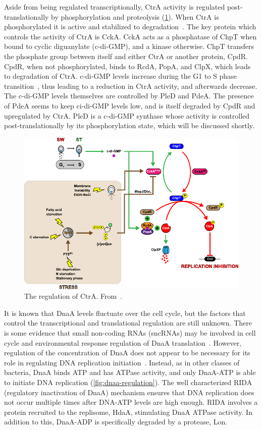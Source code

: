 Aside from being regulated transcriptionally, CtrA activity is regulated post-translationally by phosphorylation and proteolysis (\cref{fig:ctra-regulation}).
When CtrA is phosphorylated it is active and stabilized to degradation~\cite{frandi2019}.
The key protein which controls the activity of CtrA is CckA.
CckA acts as a phosphatase of ChpT when bound to cyclic diguanylate (c-di-GMP), and a kinase otherwise.
ChpT transfers the phosphate group between itself and either CtrA or another protein, CpdR.
CpdR, when not phosphorylated, binds to RcdA, PopA, and ClpX, which leads to degradation of CtrA.
c-di-GMP levels increase during the G1 to S phase transition~\cite{hallez2017}, thus leading to a reduction in CtrA activity, and afterwards decrease.
The c-di-GMP levels themselves are controlled by PleD and PdeA.
The presence of PdeA seems to keep ci-di-GMP levels low, and is itself degraded by CpdR and upregulated by CtrA.
PleD is a c-di-GMP synthase whose activity is controlled post-translationally by its phosphorylation state, which will be discussed shortly.

\begin{figure}
    \centering
    \includegraphics{ctra-regulation}
    \caption{
        The regulation of CtrA.
        From~\cite{frandi2019}.
        \label{fig:ctra-regulation}
     }
\end{figure}

It is known that DnaA levels fluctuate over the cell cycle, but the factors that control the transcriptional and translational regulation are still unknown.
There is some evidence that small non-coding RNAs (sncRNAs) may be involved in cell cycle and environmental response regulation of DnaA translation~\cite{felletti2019}.
However, regulation of the concentration of DnaA does not appear to be necessary for its role in regulating DNA replication initiation~\cite{jonas2011}.
Instead, as in other classes of bacteria, DnaA binds ATP and has ATPase activity, and only DnaA-ATP is able to initiate DNA replication (\cref{fig:dnaa-regulation}).
The well characterized RIDA (regulatory inactivation of DnaA) mechanism ensures that DNA replication does not occur multiple times after DNA-ATP levels are high enough.
RIDA involves a protein recruited to the replisome, HdaA, stimulating DnaA ATPase activity.
In addition to this, DnaA-ADP is specifically degraded by a protease, Lon.

